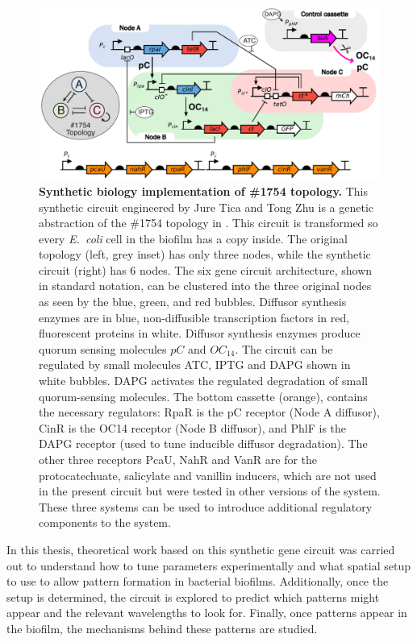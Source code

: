 \begin{figure}[H]
    \centering
    \includegraphics[width=1\textwidth]{chapters/Chapter 2/synthetic circuit2}
    \caption{\textbf{Synthetic biology implementation of \#1754 topology.} This synthetic circuit engineered by Jure Tica and Tong Zhu is a genetic abstraction of the \#1754 topology in \cite{Scholes2019}. This circuit is transformed so every \textit{E.~coli} cell in the biofilm has a copy inside. The original topology (left, grey inset) has only three nodes, while the synthetic circuit (right) has 6 nodes. The six gene circuit architecture, shown in standard notation, can be clustered into the three original nodes as seen by the blue, green, and red bubbles. Diffusor synthesis enzymes are in blue, non-diffusible transcription
    factors in red, fluorescent proteins in white. Diffusor synthesis enzymes produce quorum sensing molecules $pC$ and $OC_{14}$. The circuit can be regulated by small molecules ATC, IPTG and DAPG shown in white bubbles. DAPG activates the regulated degradation of small quorum-sensing molecules. The bottom cassette (orange), contains the necessary regulators: RpaR is the pC receptor (Node A diffusor), CinR is the OC14 receptor (Node B diffusor), and PhlF is the DAPG receptor (used to tune inducible diffusor degradation). The other three receptors PcaU, NahR and VanR are for the protocatechuate, salicylate and vanillin inducers, which are not used in the present circuit but were tested in other versions of the system. These three systems can be used to introduce additional regulatory components to the system.}
    \label{fig:synthetic circuit}
\end{figure}

In this thesis, theoretical work based on this synthetic gene circuit was carried out to understand how to tune parameters experimentally and what spatial setup to use to allow pattern formation in bacterial biofilms.
Additionally, once the setup is determined, the circuit is explored to predict which patterns might appear and the relevant wavelengths to look for.
Finally, once patterns appear in the biofilm, the mechanisms behind these patterns are studied. 

